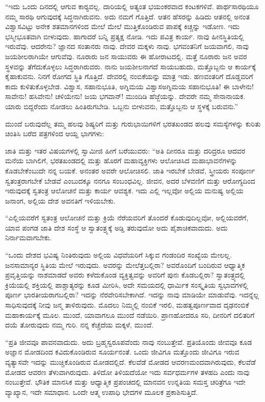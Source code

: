  “ಇದು ಒಂದು ದಿನದಲ್ಲಿ ಆಗುವ ಕಾರ‍್ಯವಲ್ಲ. ದಾರಿಯಲ್ಲಿ ಅತ್ಯಂತ ಭಯಂಕರವಾದ ಕಂಟಕಗಳಿವೆ. ಪಾರ್ಥಸಾರಥಿಯೂ ನಮ್ಮ ಸಾರಥಿ ಆಗುವುದಕ್ಕೆ ಸಿದ್ಧನಾಗಿರುವನು. ಅದು ನಮಗೆ ಗೊತ್ತಿದೆ. ಆತನ ಹೆಸರನ್ನು ಹಿಡಿದು ಆತನಲ್ಲಿ ಅನಂತ ವಿಶ್ವಾಸವಿಟ್ಟು ಅನೇಕ ಶತಮಾನಗಳಿಂದ ಮೇಲೆ ಮೇಲೆ ಮುತ್ತಿಕೊಂಡಿರುವ ಪಾಪಕ್ಕೆ ಕಿಚ್ಚನ್ನು ಇಡೋಣ. ಇದು ಭಸ್ಮೀಭೂತವಾಗಿ ಬೀಳುವುದು. ಹಾಗಾದರೆ ಬನ್ನಿ ಪ್ರತ್ಯಕ್ಷ ನೋಡಿ. ಇದು ಪವಿತ್ರ ಕಾರ್ಯ. ನಾವು ಹೀನಸ್ಥಿತಿಯಲ್ಲಿ ಇರುವೆವು. ಆದರೇನು? ಜ್ಞಾನದ ಸಂತಾನರು ನಾವು. ದೇವರ ಮಕ್ಕಳು ನಾವು. ಭಗವಂತನಿಗೆ ಜಯವಾಗಲಿ, ನಾವು ಜಯಶೀಲರಾಗಿಯೇ ಆಗುವೆವು. ನೂರಾರು ಜನ ಸಾಯುವರು ಈ ಹೋರಾಟದಲ್ಲಿ. ಮತ್ತೆ ನೂರಾರು ಜನ ಅವರ ಸ್ಥಳವನ್ನು ತೆಗೆದುಕೊಳ್ಳಲು ಸಿದ್ಧರಾಗಿರುವರು. ನಾನು ಜಯಶೀಲನಾಗದೆ ಸಾಯಬಹುದು, ಮತ್ತೊಬ್ಬನು ಆ ಕಾರ್ಯಕ್ಕೆ ಕೈಹಾಕುವನು. ನಿನಗೆ ರೋಗದ ಸ್ಥಿತಿ ಗೊತ್ತಿದೆ. ದೇವರಲ್ಲಿ ನಂಬಿಕೆಯನ್ನು ಮಾತ್ರ ಇಡು. ಹಣವಂತರಿಗೆ ದೊಡ್ಡವರಿಗೆ ಕಾದು ಕುಳಿತುಕೊಳ್ಳಬೇಡ. ವಿಶ್ವಾಸ, ಸಹಾನುಭೂತಿ, ಅಗ್ನಿಮಯ ವಿಶ್ವಾಸ\break ಅಗ್ನಿಮಯ ಸಹಾನುಭೂತಿ! ಈ ಬಾಳೇನು! ಸಾವೇನು! ಹಸಿವೇನು! ಚಳಿಯೇನು! ಜಯ ಭಗವಾನ್! ಮುಂದಿಡಿ ಹೆಜ್ಜೆಯನ್ನು. ದೇವರೇ ನಮ್ಮ ಸೇನಾನಾಯಕ. ಯಾರು ಬಿದ್ದರೆಂದು ನೋಡಲು ಹಿಂತಿರುಗಬೇಡಿ. ಒಬ್ಬನು ಬೀಳುವನು, ಮತ್ತೊಬ್ಬನು ಆ ಸ್ಥಳಕ್ಕೆ ಬರುವನು.” 

 ಮುಂದೆ ಬರುವುದೆಲ್ಲ ತಮ್ಮ ಹಲವು ಶಿಷ್ಯರಿಗೆ ಮತ್ತು ಗುರುಭಾಯಿಗಳಿಗೆ ಭರತಖಂಡದ ಹಲವು ಸಮಸ್ಯೆಗಳನ್ನು ಕುರಿತು ಚಿಂತಿಸಿ ಬರೆದ ಪತ್ರಗಳಿಂದ ಆಯ್ದ ಭಾಗಗಳು: 

 ಜಾತಿ ಮತ್ತು ಇತರ ವಿಷಯಗಳಲ್ಲಿ ಸ್ವಾಮೀಜಿ ಹೀಗೆ ಬರೆಯುವರು: “ಅತಿ ದೀನರೂ ಮತ್ತು ದರಿದ್ರರೂ ಆದವರ ಮನೆಯ ಬಾಗಿಲಿಗೆ, ಭರತಖಂಡದಲ್ಲಿ ಮತ್ತು ಹೊರಗೆ ಮಹಾವ್ಯಕ್ತಿಗಳು ಆಲೋಚಿಸಿದ ಮಹಾಭಾವನೆಗಳನ್ನು ಕೊಡಬೇಕೆಂಬುದೇ ನನ್ನ ಬಯಕೆ. ಅನಂತರ ಅವರೇ ಆಲೋಚಿಸಲಿ. ಜಾತಿ ಇರಬೇಕೆ ಬೇಡವೆ, ಸ್ತ್ರೀಯರು ಸಂಪೂರ್ಣ ಸ್ವತಂತ್ರರಾಗಬೇಕೆ ಬೇಡವೆ ಎಂಬುದಕ್ಕೂ ನನಗೂ ಸಂಬಂಧವಿಲ್ಲ. ಜೀವನ, ಅದರ ಬೆಳವಣಿಗೆ ಮತ್ತು ಆರೋಗ್ಯದಿಂದ ಇರುವುದಕ್ಕೆ ಸ್ವತಂತ್ರ ಆಲೋಚನೆ ಮತ್ತು ಕಾರ್ಯ ಆವಶ್ಯಕ. ಇದು ಎಲ್ಲಿ ಇಲ್ಲವೋ ಅಲ್ಲಿಯ ಮನುಷ್ಯ ಅಲ್ಲಿಯ ಜನಾಂಗ, ಅಲ್ಲಿಯ ದೇಶ ಅವನತಿಗೆ ಇಳಿಯಬೇಕು.

 “ಎಲ್ಲಿಯವರೆಗೆ ಸ್ವತಂತ್ರ ಆಲೋಚನೆ ಮತ್ತು ಕ್ರಿಯೆ ನೆರೆಯವರಿಗೆ ತೊಂದರೆ ಕೊಡುವುದಿಲ್ಲವೋ‌, ಅಲ್ಲಿಯವರೆಗೆ, ಯಾವ ಪಂಗಡ ಜಾತಿ ದೇಶ ಸಂಸ್ಥೆ ಆ ಸ್ವಾತಂತ್ರ್ಯಕ್ಕೆ ಅಡ್ಡಿ ತರುವುದೋ ಅದು ಪೈಶಾಚಿಕವಾದುದು. ಅದು ನಿರ್ನಾಮವಾಗಬೇಕು.

 “ಒಂದು ದೇಶದ ಭವಿಷ್ಯ ನಿಂತಿರುವುದು ಅಲ್ಲಿಯ ವಿಧವೆಯರಿಗೆ ಸಿಕ್ಕುವ ಗಂಡಂದಿರ ಸಂಖ್ಯೆಯ ಮೇಲಲ್ಲ. ಜನಸಾಮಾನ್ಯರ ಸ್ಥಿತಿಯ ಮೇಲೆ ಇರುವುದು. ಅವರನ್ನು ಮೇಲೆತ್ತಬಲ್ಲಿರಾ? ಅವರೊಂದಿಗೆ ಬಂದಿರುವ ಆಧ್ಯಾತ್ಮಿಕ ಪ್ರವೃತ್ತಿಯನ್ನು ನಾಶಮಾಡದೆ ಅವರು ಕಳೆದುಕೊಂಡ ವ್ಯಕ್ತಿತ್ವವನ್ನು ಅವರಿಗೆ ಪುನಃ ಕೊಡಬಲ್ಲಿರಾ? ಸ್ವಾತಂತ್ರ್ಯದಲ್ಲಿ ಕ್ರಿಯೆಯಲ್ಲಿ ಶಕ್ತಿಯಲ್ಲಿ ಪಾಶ್ಚಾತ್ಯರನ್ನು ಕೂಡ ಮೀರಿಸಿ, ಅದೇ ಸಮಯದಲ್ಲಿ ಧಾರ್ಮಿಕ ಸಂಸ್ಕೃತಿಯ ಸ್ವಭಾವಗಳಲ್ಲಿ ಪೂರ್ಣ ಭಾರತೀಯರಾಗಬಲ್ಲಿರಾ? ಇದನ್ನು ನೆರವೇರಿಸಬೇಕಾಗಿದೆ. ಇದನ್ನು ನಾವು ಮಾಡಿಯೇ ಮಾಡುವೆವು. ಇದನ್ನೆಲ್ಲ ಸಾಧಿಸುವುದಕ್ಕೆ ನೀವು ಜನ್ಮ ತಾಳಿರುವುದು. ಮೊದಲು ನಿಮ್ಮಲ್ಲಿ ನಂಬಿಕೆ ಇರಲಿ, ಮಹತ್ವಪೂರ್ಣವಾದ ದೃಢನಂಬಿಕೆ ಮಹಾಕಾರ್ಯಕ್ಕೆ ಮೂಲ. ಮುಂದೆ, ಯಾವಾಗಲೂ ಮುಂದೆ ನಡೆಯಿರಿ. ಪ್ರಾಣಹೋದರೂ ಸರಿ, ದೀನರಿಗೆ ದಲಿತರಿಗೆ ದಯೆ ತೋರುವುದು ನಮ್ಮ ಗುರಿ. ನನ್ನ ಕೆಚ್ಚೆದೆಯ ಮಕ್ಕಳೆ, ಮುಂದೆ.

 “ಪ್ರತಿ ಜೀವವೂ ಪಾವನವಾದುದು. ಅದು ಬ್ರಹ್ಮಸ್ವರೂಪವೆಂದು ನಾವು ನಂಬುತ್ತೇವೆ. ಪ್ರತಿಯೊಂದು ಜೀವವೂ ಕೂಡ ಅಜ್ಞಾನ ಮೋಡದಿಂದ ಕವಿದುಕೊಂಡಿರುವ ಸೂರ್ಯನಂತೆ. ಒಂದು ಜೀವಿಗೂ ಮತ್ತೊಂದು ಜೀವಿಗೂ ಇರುವ ವ್ಯತ್ಯಾಸವೇ ಇದನ್ನು ಮುಚ್ಚಿಕೊಂಡಿರುವ ಮೋಡದಲ್ಲಿದೆ. ಕೆಲವೆಡೆ ಮೋಡದ ಆವರಣ\break ಮಂದವಾಗಿರುವುದು, ಕೆಲವೆಡೆ ಮೋಡದ ಆವರಣ ತೆಳುವಾಗಿರುವುದು. ತಿಳಿದೋ ತಿಳಿಯದೆಯೋ ಇದು ಸರ್ವಧರ್ಮಗಳ ತಳಹದಿ ಎಂದು ನಾವು ನಂಬುತ್ತೇವೆ. ಭೌತಿಕ ಮಾನಸಿಕ ಮತ್ತು ಆಧ್ಯಾತ್ಮಿಕ ಪ್ರಪಂಚದಲ್ಲಿ ಮಾನವನ ಉನ್ನತಿಯ ಸಮಸ್ತ ಚರಿತ್ರೆಗೂ ಇದೇ ವ್ಯಾಖ್ಯಾನ, ಇದೇ ಸಮಾಧಾನ. ಒಂದೇ ಆತ್ಮ ಉಪಾಧಿ ಭೇದಗಳ ಮೂಲಕ ಪ್ರಕಾಶಿಸುತ್ತಿದೆ.

